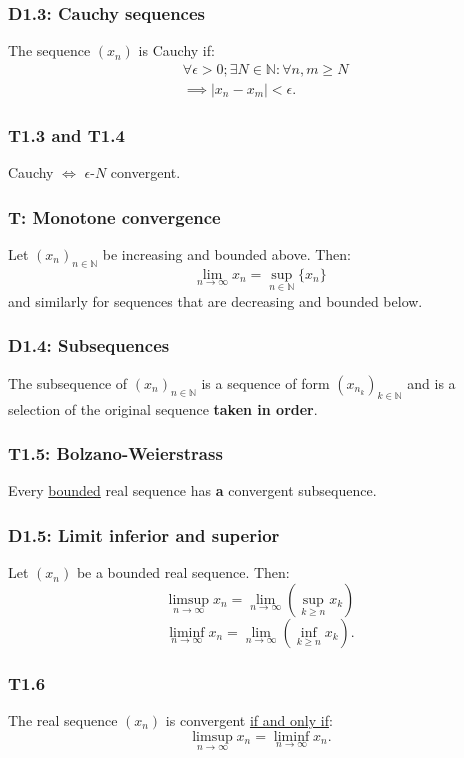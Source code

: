 \documentclass{article}
\begin{document}
\begin{multicols*}{3}
\subsubsection*{D1.3: Cauchy sequences}
The sequence $(x_n)$ is Cauchy if:
\begin{align*}
    &\forall\epsilon>0;\exists N\in\mathbb{N}:
    \forall n,m\geq N \\ &\implies |x_n-x_m|<\epsilon.
\end{align*}

\subsubsection*{T1.3 and T1.4}
Cauchy $\iff$ $\epsilon$-$N$ convergent.

\subsubsection*{T: Monotone convergence}
Let $(x_n)_{n\in\mathbb{N}}$ be increasing and
bounded above. Then:
$$\lim_{n\rightarrow\infty}x_n=\sup_{n\in\mathbb{N}}
\{x_n\}$$
and similarly for sequences that are
decreasing and bounded below.

\subsubsection*{D1.4: Subsequences}
The subsequence of $(x_n)_{n\in\mathbb{N}}$ is
a sequence of form $(x_{n_k})_{k\in\mathbb{N}}$
and is a selection of the original sequence 
\textbf{taken in order}.

\subsubsection*{T1.5: Bolzano-Weierstrass}
Every \underline{bounded} real sequence has \textbf{a}
convergent subsequence.

\subsubsection*{D1.5: Limit inferior and superior}
Let $(x_n)$ be a bounded real sequence. Then:
$$\limsup_{n\rightarrow\infty}x_n
=\lim_{n\rightarrow\infty}\left(\sup_{k\geq n}x_k\right)$$
$$\liminf_{n\rightarrow\infty}x_n
=\lim_{n\rightarrow\infty}\left(\inf_{k\geq n}x_k\right).$$

\subsubsection*{T1.6}
The real sequence $(x_n)$ is convergent
\underline{if and only if}:
$$\limsup_{n\rightarrow\infty}x_n
=\liminf_{n\rightarrow\infty}x_n.$$


\end{multicols*}
\end{document}
